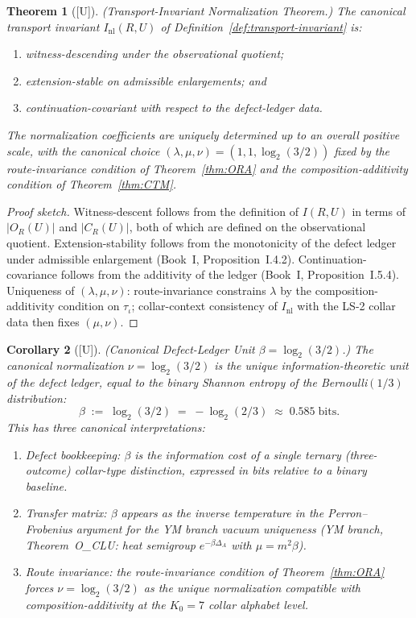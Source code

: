 \documentclass[12pt,oneside]{amsbook}
\theoremstyle{plain}
\newtheorem{theorem}{Theorem}[section]
\newtheorem{corollary}[theorem]{Corollary}
\theoremstyle{definition}
\theoremstyle{remark}
\newcommand{\status}[1]{\textup{[#1]}}
\begin{document}
\begin{theorem}[\status{U}]\label{thm:normalization}
\textup{(Transport-Invariant Normalization Theorem.)}  The canonical
transport invariant $I_{\mathrm{nl}}(R, U)$ of
Definition~\ref{def:transport-invariant} is:
\begin{enumerate}[label=\textup{(\alph*)}]
  \item witness-descending under the observational quotient;
  \item extension-stable on admissible enlargements; and
  \item continuation-covariant with respect to the defect-ledger
        data.
\end{enumerate}
The normalization coefficients are uniquely determined up to an overall
positive scale, with the canonical choice $(\lambda, \mu, \nu) = (1,
1, \log_2(3/2))$ fixed by the route-invariance condition of
Theorem~\ref{thm:ORA} and the composition-additivity condition of
Theorem~\ref{thm:CTM}.
\end{theorem}

\begin{proof}[Proof sketch]
Witness-descent follows from the definition of $I(R,U)$ in terms of
$|O_R(U)|$ and $|C_R(U)|$, both of which are defined on the
observational quotient.  Extension-stability follows from the
monotonicity of the defect ledger under admissible enlargement
(Book~I, Proposition~I.4.2).  Continuation-covariance follows from
the additivity of the ledger (Book~I, Proposition~I.5.4).  Uniqueness
of $(\lambda, \mu, \nu)$: route-invariance constrains $\lambda$ by the
composition-additivity condition on $\tau_\iota$; collar-context
consistency of $I_{\mathrm{nl}}$ with the LS-2 collar data then fixes
$(\mu, \nu)$.
\end{proof}

\begin{corollary}[\status{U}]\label{cor:beta-canonical}
\textup{(Canonical Defect-Ledger Unit $\beta = \log_2(3/2)$.)}
The canonical normalization $\nu = \log_2(3/2)$ is the unique
information-theoretic unit of the defect ledger, equal to the
binary Shannon entropy of the Bernoulli$(1/3)$ distribution:
\[
  \beta \;:=\; \log_2(3/2) \;=\; -\log_2(2/3) \;\approx\; 0.585\;\mathrm{bits}.
\]
This has three canonical interpretations:
\begin{enumerate}[label=\textup{(\arabic*)}]
  \item \emph{Defect bookkeeping}: $\beta$ is the information
    cost of a single ternary (three-outcome) collar-type
    distinction, expressed in bits relative to a binary baseline.
  \item \emph{Transfer matrix}: $\beta$ appears as the inverse
    temperature in the Perron--Frobenius argument for the YM
    branch vacuum uniqueness (YM branch,
    Theorem~O\_CLU: heat semigroup $e^{-\beta\Delta_A}$ with
    $\mu = m^2\beta$).
  \item \emph{Route invariance}: the route-invariance condition
    of Theorem~\ref{thm:ORA} forces $\nu = \log_2(3/2)$ as the
    unique normalization compatible with composition-additivity
    at the $K_0 = 7$ collar alphabet level.
\end{enumerate}
\end{corollary}
\end{document}
